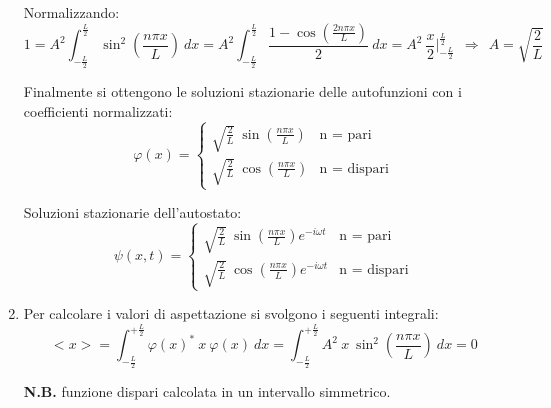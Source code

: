 \documentclass[12pt,twoside,a4]{article}
\begin{document}
\begin{solution}
\begin{enumerate}[label=(\textit{\roman*})]
Normalizzando: \begin{equation*}
 1 = A^2 \int_{-\frac{L}{2}}^{\frac{L}{2}} {\sin^2{\left( \frac{n \pi x}{L} \right)}} \ dx =  A^2 \int_{-\frac{L}{2}}^{\frac{L}{2}} { \frac{1- \cos{\left( \frac{ 2 n \pi x}{L} \right)}}{2}} \ dx = A^2 \ \frac{x}{2} \Big|_{-\frac{L}{2}}^{\frac{L}{2}} \ \  \Rightarrow \ \  A = \sqrt{\frac{2}{L}}  
\end{equation*}

Finalmente si ottengono le soluzioni stazionarie delle autofunzioni con i coefficienti normalizzati: \begin{equation*}
\varphi(x) = \begin{cases}
    \sqrt{\frac{2}{L}} \ \sin{\left(\frac{n \pi x }{L}\right)}  &  \text{n = pari} \\
    \sqrt{\frac{2}{L}} \ \cos{\left(\frac{n \pi x }{L}\right)}  &  \text{n = dispari}
\end{cases} 
\end{equation*}

Soluzioni stazionarie dell'autostato: \begin{equation*}
    \psi(x, t) = \begin{cases}
    \sqrt{\frac{2}{L}} \ \sin{\left(\frac{n \pi x }{L}\right)} e^{-i\omega t}  &  \text{n = pari} \\
    \sqrt{\frac{2}{L}} \ \cos{\left(\frac{n \pi x }{L}\right)} e^{-i\omega t}  &  \text{n = dispari}
\end{cases} 
\end{equation*}

\item  Per calcolare i valori di aspettazione si svolgono i seguenti integrali: \begin{equation*}
    < x >  = \int_{-\frac{L}{2}}^{+\frac{L}{2}} {\varphi(x)^\ast \ x \ \varphi(x)} \ dx = \int_{-\frac{L}{2}}^{+\frac{L}{2}} {A^2 \ x \ \sin^2{\left( \frac{n \pi x}{L}\right )} } \ dx = 0        
\end{equation*}

\textbf{N.B.} funzione dispari calcolata in un intervallo simmetrico.



\end{enumerate}
\end{solution}
\end{document}
